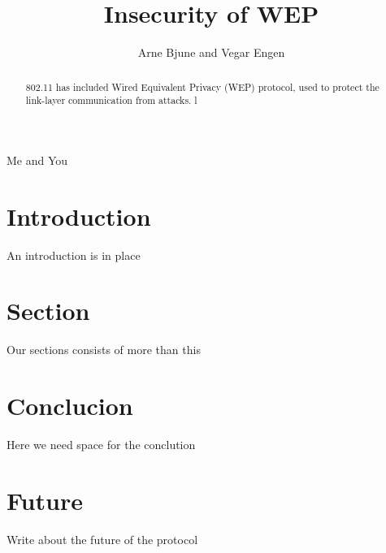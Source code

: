 \documentclass[twocolumn]{IEEEtran}
\begin{document}
\title{Insecurity of WEP}


\author{Arne Bjune and Vegar Engen}

{Me and You}

\maketitle

\begin{abstract}
802.11 has included Wired Equivalent Privacy (WEP) protocol, used to protect the link-layer communication from attacks.  l
\end{abstract}

\section {Introduction}
\label{sec:introduction}

An introduction is in place




\section {Section}
Our sections
consists of more than this




\section {Conclucion}
\label{sec:conclusion}

Here we need space for the conclution



\section {Future}
\label{sec:future}

Write about the future of the protocol




\end{document}
